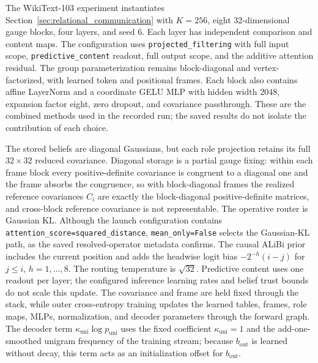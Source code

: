 \documentclass[twoside,11pt]{article}
\begin{document}
The WikiText-103 \citep{merity2017pointer} experiment instantiates Section~\ref{sec:relational_communication} with $K=256$, eight $32$-dimensional gauge blocks, four layers, and seed 6. Each layer has independent comparison and content maps. The configuration uses \texttt{projected\_\allowbreak filtering} with full input scope, \texttt{predictive\_\allowbreak content} readout, full output scope, and the additive attention residual. The group parameterization remains block-diagonal and vertex-factorized, with learned token and positional frames. Each block also contains affine LayerNorm and a coordinate GELU MLP with hidden width $2048$, expansion factor eight, zero dropout, and covariance passthrough. These are the combined methods used in the recorded run; the saved results do not isolate the contribution of each choice.

The stored beliefs are diagonal Gaussians, but each role projection retains its full $32\times32$ reduced covariance. Diagonal storage is a partial gauge fixing: within each frame block every positive-definite covariance is congruent to a diagonal one and the frame absorbs the congruence, so with block-diagonal frames the realized reference covariances $C_i$ are exactly the block-diagonal positive-definite matrices, and cross-block reference covariance is not representable. The operative router is Gaussian KL. Although the launch configuration contains \texttt{attention\_\allowbreak score=squared\_\allowbreak distance}, \texttt{mean\_\allowbreak only=False} selects the Gaussian-KL path, as the saved resolved-operator metadata confirms. The causal ALiBi prior includes the current position and adds the headwise logit bias $-2^{-h}(i-j)$ for $j\le i$, $h=1,\ldots,8$. The routing temperature is $\sqrt{32}$. Predictive content uses one readout per layer; the configured inference learning rates and belief trust bounds do not scale this update. The covariance and frame are held fixed through the stack, while outer cross-entropy training updates the learned tables, frames, role maps, MLPs, normalization, and decoder parameters through the forward graph. The decoder term $\kappa_{\mathrm{uni}}\log p_{\mathrm{uni}}$ uses the fixed coefficient $\kappa_{\mathrm{uni}}=1$ and the add-one-smoothed unigram frequency of the training stream; because $b_{\mathrm{out}}$ is learned without decay, this term acts as an initialization offset for $b_{\mathrm{out}}$.
\end{document}
